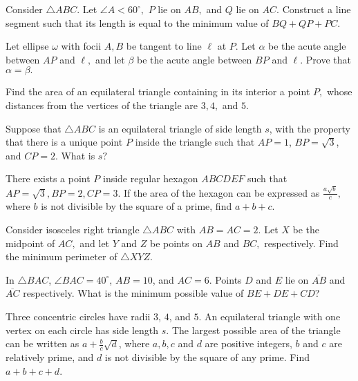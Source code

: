\documentclass{article}
\begin{document}
    \begin{prob}[]{4}
    Consider $\triangle ABC.$ Let $\angle A<60^{\circ},$ $P$ lie on $AB,$ and $Q$ lie on $AC.$ Construct a line segment such that its length is equal to the minimum value of $BQ+QP+PC.$
    \end{prob}

    \begin{prob}[]{6}
Let ellipse $\omega$ with focii $A,B$ be tangent to line $\ell$ at $P.$ Let $\alpha$ be the acute angle between $AP$ and $\ell,$ and let $\beta$ be the acute angle between $BP$ and $\ell.$ Prove that $\alpha=\beta.$
\end{prob}
    
    \begin{prob}[]{6}
Find the area of an equilateral triangle containing in its interior a point $P,$ whose distances from the vertices of the triangle are $3,4,$ and $5.$
\end{prob}  
    
    \begin{prob}[AMC 12A 2020/24]{6}
Suppose that $\triangle ABC$ is an equilateral triangle of side length $s$, with the property that there is a unique point $P$ inside the triangle such that $AP = 1$, $BP = \sqrt{3}$, and $CP = 2$. What is $s?$
\end{prob}
    
    \begin{prob}{6}
 There exists a point $P$ inside regular hexagon $ABCDEF$ such that $AP=\sqrt{3},BP=2,CP=3.$ If the area of the hexagon can be expressed as $\frac{a\sqrt{b}}{c},$ where $b$ is not divisible by the square of a prime, find $a+b+c.$
\end{prob}

    \begin{prob}[China]{6}
Consider isosceles right triangle $\triangle ABC$ with $AB=AC=2.$ Let $X$ be the midpoint of $AC,$ and let $Y$ and $Z$ be points on $AB$ and $BC,$ respectively. Find the minimum perimeter of $\triangle XYZ.$
\end{prob}
    
    \begin{prob}[AMC 12A 2014/20]{6}
In $\triangle BAC$, $\angle BAC=40^\circ$, $AB=10$, and $AC=6$. Points $D$ and $E$ lie on $\overline{AB}$ and $\overline{AC}$ respectively. What is the minimum possible value of $BE+DE+CD$?
\end{prob}
    
    \begin{prob}[AIME I 2012/13]{6}
 Three concentric circles have radii $3$, $4$, and $5$.  An equilateral triangle with one vertex on each circle has side length $s$.  The largest possible area of the triangle can be written as $a+\frac{b}{c}\sqrt{d}$, where $a,b,c$ and $d$ are positive integers, $b$ and $c$ are relatively prime, and $d$ is not divisible by the square of any prime.  Find $a+b+c+d$.
\end{prob}
    
\end{document}
